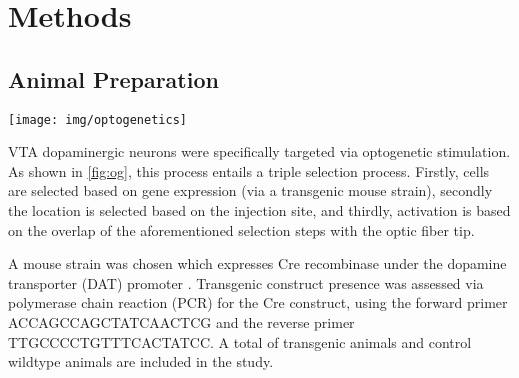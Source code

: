\section{Methods}

\subsection{Animal Preparation}

\begin{sansmath}
\begin{figure*}[h!]
	\centering
	\texttt{[image: img/optogenetics]}
	\caption{
		Schematic of optogenetic cell selection and activation.
		Orange denotes dopaminergic cells, gray enlarged elements on the cell periphery indicate channelrhodopsin expression, and cyan segments on the cell periphery denote depolarization events.
		Note that by placing the stimulation fiber tip and the injection site at the same position, the selection effects of the second and third procedures are mutually redundant.
		}
	\label{fig:og}
\end{figure*}
\end{sansmath}

\begin{sansmath}
\end{sansmath}

VTA dopaminergic neurons were specifically targeted via optogenetic stimulation.
As shown in \cref{fig:og}, this process entails a triple selection process.
Firstly, cells are selected based on gene expression (via a transgenic mouse strain), secondly the location is selected based on the injection site, and thirdly, activation is based on the overlap of the aforementioned selection steps with the optic fiber tip.

A mouse strain was chosen which expresses Cre recombinase under the dopamine transporter (DAT) promoter \cite{dat}.
Transgenic construct presence was assessed via polymerase chain reaction (PCR) for the Cre construct, using the forward primer ACCAGCCAGCTATCAACTCG and the reverse primer TTGCCCCTGTTTCACTATCC.
A total of  transgenic animals and  control wildtype animals are included in the study.

